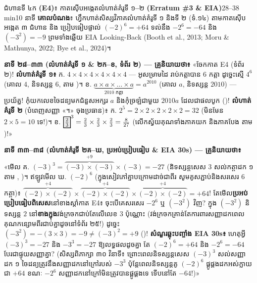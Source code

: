 \documentclass[a4paper,12pt]{article}
\newcommand{\en}[1]{{\TimesEn #1}}
\newcommand{\enbf}[1]{{\TimesEn\textbf{#1}}}
\newcommand{\cnum}[1]{{\TimesEn\fontsize{10.5pt}{12pt}\selectfont\ding{\numexpr181+#1\relax}}}
\newcommand{\lockbox}[1]{\tikz[baseline=(X.base)]\node[draw=black, line width=0.85pt, fill=panelgray, inner sep=1.8pt, anchor=base] (X) {$#1$};}
\begin{document}
\Needspace{1.5cm}
\begin{phasebox}{ជំហានទី ៤ក \enbf{(E4)}៖ កាតស៊ើបអង្កេតលំហាត់គំរូទី ១\enbf{--}២ \enbf{(Erratum \#3 \& EIA)}}{28--38 min}{10 នាទី}
\textbf{គោលបំណង}៖ ហ្វឹកហាត់សិស្សវិភាគលំហាត់គំរូទី ១ និងទី ២ (ទំ\en{.}១៤) តាមកាតស៊ើបអង្កេត ៣ ជំហាន និង \en{[tracing]} ប្រៀបធៀបផ្ទាល់ $(-2)^6=+64$ ទល់នឹង $-2^6=-64$ និង $(-3^2)=-9$ ព្រមទាំងឆ្លើយ \en{EIA Looking-Back} \en{(Booth et al., 2013; Moru \& Mathunya, 2022; Bye et al., 2024)}។
\end{phasebox}
\begin{scriptbox}
  \textbf{នាទី ២៨\en{--}៣៣ (លំហាត់គំរូទី ១ \en{\&} ២ក\en{--}ខ, ទំព័រ ២) — គ្រូនិយាយថា៖} «ចែកកាត \en{E4} (ទំព័រ ២)! \textbf{លំហាត់គំរូទី ១៖} ក\en{.} $4\times 4\times 4\times 4\times 4\times 4$ — អូសម្រាមដៃ \en{[tracing]} រាប់កត្តាបាន $6$ កត្តា ដូច្នេះស្មើ $4^6$ (គោល $4$, និទស្សន្ត $6$, តាម \cnum{1})។ ខ\en{.} $\underbrace{a\times a\times\dots\times a}_{2010\text{ កត្តា}} = a^{2010}$ (គោល $a$, និទស្សន្ត $2010$) — ប្រយ័ត្ន! កុំយកលេខចៃដន្យមកជំនួសអក្សរ $a$ និងកុំច្រឡំជាមួយ $2010a$ ដែលជាផលបូក (\cnum{2})! \textbf{លំហាត់គំរូទី ២} (បំពេញសញ្ញា «។» ចុងប្រធាន)៖ ក\en{.} $2^5 = 2\times 2\times 2\times 2\times 2 = 32$ (មិនមែន $2\times 5=10$ ទេ!)។ ខ\en{.} $\lockbox{\tfrac{2}{3}}^3 = \frac{2}{3}\times\frac{2}{3}\times\frac{2}{3} = \frac{8}{27}$ (លើកស្វ័យគុណទាំងភាគយក និងភាគបែង តាម \cnum{5})!»\par\vspace{0.5pt}
  \textbf{នាទី ៣៣\en{--}៣៨ (លំហាត់គំរូទី ២គ\en{--}ឃ, ប្រអប់ប្រៀបធៀប \en{\& EIA 30s}) — គ្រូនិយាយថា៖} «មើល គ\en{.} $(-3)^3 = \overbrace{(-3)\times(-3)}^{+9}\times(-3) = -27$ (និទស្សន្តសេស $3$ សល់កត្តាដក ១ តាម \cnum{3}, \cnum{4})។ ឥឡូវមើល ឃ\en{.} $(-2)^6$ (ក្នុងសៀវភៅគ្នាបក្រោមដាច់ជាពីរ សូមគូសភ្ជាប់និងសរសេរ $6$ កត្តា)៖ $\overbrace{(-2)\times(-2)}^{+4}\times\overbrace{(-2)\times(-2)}^{+4}\times\overbrace{(-2)\times(-2)}^{+4} = +64$! តែមើល\textbf{ប្រអប់ប្រៀបធៀបពិសេស}នៅខាងស្ដាំកាត \en{E4}៖ ចុះបើគេសរសេរ $-2^6$ ឬ $(-3^2)$ វិញ? ក្នុង $(-3^2)$ និទស្សន្ត $2$ នៅ\textbf{ខាងក្នុង}វង់ក្រចកជាប់តែលើលេខ $3$ ប៉ុណ្ណោះ (វង់ក្រចកគ្រាន់តែការពារសញ្ញាដកពេលគុណកន្សោមពីរជាប់គ្នាដូចនៅទំព័រ ២៥!) ដូច្នេះ $(-3^2) = -(3\times 3) = -9 \neq (-3)^2 = +9$ (\cnum{3})! \textbf{សំណួរឆ្លុះបញ្ចាំង \en{EIA 30s}៖} ហេតុអ្វី $(-3)^3 = -27$ និង $-3^3 = -27$ ឱ្យលទ្ធផលដូចគ្នា តែ $(-2)^6 = +64$ និង $-2^6 = -64$ បែរជាផ្ទុយសញ្ញាគ្នា? (សិស្សពិភាក្សា ៣០ វិនាទី៖ ព្រោះពេលនិទស្សន្តសេស $(-3)^3$ សល់សញ្ញាដក ១ ចៃដន្យត្រូវនឹងសញ្ញាដកនៅក្រៅរបស់ $-3^3$ ប៉ុន្តែពេលនិទស្សន្តគូ $(-2)^6$ ផ្គូផ្គងដកអស់ក្លាយជា $+64$ ខណៈ $-2^6$ សញ្ញាដកនៅក្រៅមិនត្រូវបានផ្គូផ្គងទេ ទើបនៅតែ $-64$!)»
\end{scriptbox}
\end{document}
